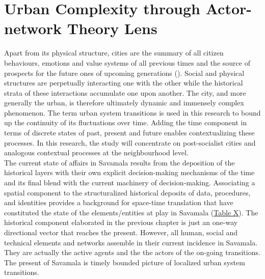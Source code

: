 \documentclass[11pt]{report}
\begin{document}


\chapter{Urban Complexity through Actor-network Theory Lens}

Apart from its physical structure, cities are the summary of all citizen behaviours, emotions and value systems of all previous times and the source of prospects for the future ones of upcoming generations (\href{ref}{\citealt{stojkov_grad_2013}}).
Social and physical structures are perpetually interacting one with the other while the historical strata of these interactions accumulate one upon another.
The city, and more generally the urban, is therefore ultimately dynamic and immensely complex phenomenon.
The term urban system transitions %
is used in this research to bound up the continuity of its fluctuations over time.
Adding the time component in terms of discrete states of past, present and future enables contextualizing these processes.
In this research, the study will concentrate on post-socialist cities and analogous contextual processes at the neighbourhood level.
\\

The current state of affairs in Savamala results from the deposition of the historical layers with their own explicit decision-making mechanisms of the time and its final blend with the current machinery of decision-making.
Associating a spatial component to the structuralized historical deposits of data, procedures, and identities provides a background for space-time translation that have constituted the state of the elements/entities at play in Savamala (\href{ref}{Table X}). 
The historical component elaborated in the previous chapter is just an one-way directional vector that reaches the present.
However, all human, social and technical elements and networks assemble in their current incidence in Savamala. They are actually the active agents and the the actors of the on-going transitions. The present of Savamala is timely bounded picture of localized urban system transitions. 
\\
\end{document}
